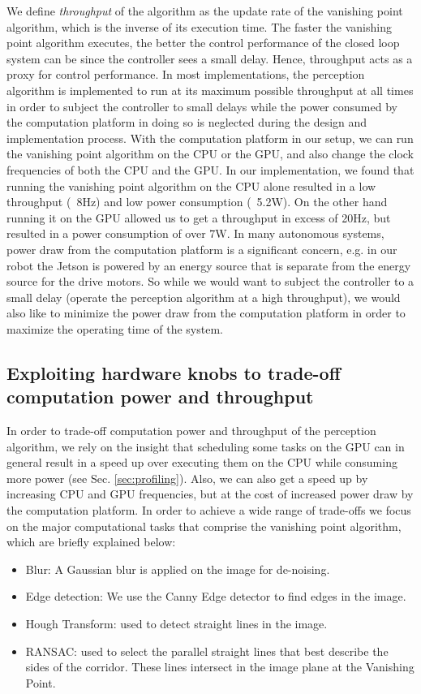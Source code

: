  We define \textit{throughput} of the algorithm as the update rate of the vanishing point algorithm, which is the inverse of its execution time. The faster the vanishing point algorithm executes, the better the control performance of the closed loop system can be since the controller sees a small delay. Hence, throughput acts as a proxy for control performance. In most implementations, the perception algorithm is implemented to run at its maximum possible throughput at all times in order to subject the controller to small delays while the power consumed by the computation platform in doing so is neglected during the design and implementation process. With the computation platform in our setup, we can run the vanishing point algorithm on the CPU or the GPU, and also change the clock frequencies of both the CPU and the GPU. In our implementation, we found that running the vanishing point algorithm on the CPU alone resulted in a low throughput (~8Hz) and low power consumption (~5.2W). On the other hand running it on the GPU allowed us to get a throughput in excess of 20Hz, but resulted in a power consumption of over 7W. In many autonomous systems, power draw from the computation platform is a significant concern, e.g. in our robot the Jetson is powered by an energy source that is separate from the energy source for the drive motors. So while we would want to subject the controller to a small delay (operate the perception algorithm at a high throughput), we would also like to minimize the power draw from the computation platform in order to maximize the operating time of the system. 


\subsection{Exploiting hardware knobs to trade-off computation power and throughput}

In order to trade-off computation power and throughput of the perception algorithm, we rely on the insight that scheduling some tasks on the GPU can in general result in a speed up over executing them on the CPU while consuming more power (see Sec. \ref{sec:profiling}). Also, we can also get a speed up by increasing CPU and GPU frequencies, but at the cost of increased power draw by the computation platform. In order to achieve a wide range of trade-offs we focus on the major computational tasks that comprise the vanishing point algorithm, which are briefly explained below:

\begin{itemize}
\item Blur: A Gaussian blur is applied on the image for de-noising.
\item Edge detection: We use the Canny Edge detector to find edges in the image.
\item Hough Transform: used to detect straight lines in the image.
\item RANSAC: used to select the parallel straight lines that best describe the sides of the corridor. These lines intersect in the image plane at the Vanishing Point.
\end{itemize}

